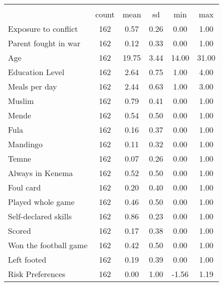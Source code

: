 {
\def\sym#1{\ifmmode^{#1}\else\(^{#1}\)\fi}
\begin{tabular}{l*{1}{ccccc}}
\hline\hline
                    &\multicolumn{5}{c}{}                                            \\
                    &       count&        mean&          sd&         min&         max\\
\hline
Exposure to conflict&         162&        0.57&        0.26&        0.00&        1.00\\
Parent fought in war&         162&        0.12&        0.33&        0.00&        1.00\\
Age                 &         162&       19.75&        3.44&       14.00&       31.00\\
Education Level     &         162&        2.64&        0.75&        1.00&        4.00\\
Meals per day       &         162&        2.44&        0.63&        1.00&        3.00\\
Muslim              &         162&        0.79&        0.41&        0.00&        1.00\\
Mende               &         162&        0.54&        0.50&        0.00&        1.00\\
Fula                &         162&        0.16&        0.37&        0.00&        1.00\\
Mandingo            &         162&        0.11&        0.32&        0.00&        1.00\\
Temne               &         162&        0.07&        0.26&        0.00&        1.00\\
Always in Kenema    &         162&        0.52&        0.50&        0.00&        1.00\\
Foul card           &         162&        0.20&        0.40&        0.00&        1.00\\
Played whole game   &         162&        0.46&        0.50&        0.00&        1.00\\
Self-declared skills&         162&        0.86&        0.23&        0.00&        1.00\\
Scored              &         162&        0.17&        0.38&        0.00&        1.00\\
Won the football game&         162&        0.42&        0.50&        0.00&        1.00\\
Left footed         &         162&        0.19&        0.39&        0.00&        1.00\\
Risk Preferences    &         162&        0.00&        1.00&       -1.56&        1.19\\

\end{tabular}}
